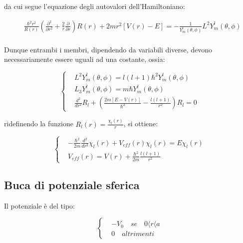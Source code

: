 \documentclass{article}
\begin{document}
da cui segue l'equazione degli autovalori dell'Hamiltoniano:

\begin{equation}
  \begin{aligned}
     & \frac{\hbar^2r^2}{R(r)}\left(\frac{\partial^2}{\partial r^2}+\frac{2}{r}\frac{\partial}{\partial r}  \right)R(r)+2mr^2[V(r)-E] =-\frac{1}{Y^l_m(\theta,\phi)}L^2Y^l_m(\theta,\phi) \\
  \end{aligned}
\end{equation}

Dunque entrambi i membri, dipendendo da variabili diverse, devono necessariamente essere uguali ad una costante,
ossia:

\begin{equation}
  \left\{
  \begin{aligned}
     & L^2Y^l_m(\theta,\phi)=l(l+1)\hbar^2Y^l_m(\theta,\phi)                                 \\
     & L_3Y^l_m(\theta,\phi)=m\hbar Y^l_m(\theta,\phi)                                       \\
     & \frac{d^2}{dr^2}R_l + \left(\frac{2m[E-V(r)]}{\hbar^2}-\frac{l(l+1)}{r^2}\right)R_l=0
  \end{aligned}
  \right.
\end{equation}

ridefinendo la funzione $R_l(r)=\frac{\chi_l(r)}{r}$, si ottiene:

\begin{equation}
  \left\{
  \begin{aligned}
     & -\frac{\hbar^2}{2m}\frac{d^2}{dr^2}\chi_l(r)+V_{eff}(r)\chi_l(r)=E\chi_l(r) \\
     & V_{eff}(r)=V(r)+\frac{\hbar^2}{2m}\frac{l(l+1)}{r^2}
  \end{aligned}
  \right.
\end{equation}

\subsection{Buca di potenziale sferica}
Il potenziale è del tipo:

\begin{equation}
  \left\{
  \begin{aligned}
     & -V_0 \quad se \quad 0\langle r\langle a \\
     & 0 \quad altrimenti
  \end{aligned}
  \right.
\end{equation}
\end{document}
